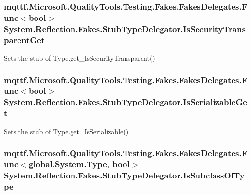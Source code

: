 \hypertarget{class_system_1_1_reflection_1_1_fakes_1_1_stub_type_delegator_a718557fd896385c5f7c66ffaca40c349}{
\subsubsection[{Is\-Security\-Transparent\-Get}]{\setlength{\rightskip}{0pt plus 5cm}mqttf.\-Microsoft.\-Quality\-Tools.\-Testing.\-Fakes.\-Fakes\-Delegates.\-Func$<$bool$>$ System.\-Reflection.\-Fakes.\-Stub\-Type\-Delegator.\-Is\-Security\-Transparent\-Get}}\label{class_system_1_1_reflection_1_1_fakes_1_1_stub_type_delegator_a718557fd896385c5f7c66ffaca40c349}


Sets the stub of Type.\-get\-\_\-\-Is\-Security\-Transparent()

\hypertarget{class_system_1_1_reflection_1_1_fakes_1_1_stub_type_delegator_aa7c37e450e2ba2416e60ce81997560fb}{
\subsubsection[{Is\-Serializable\-Get}]{\setlength{\rightskip}{0pt plus 5cm}mqttf.\-Microsoft.\-Quality\-Tools.\-Testing.\-Fakes.\-Fakes\-Delegates.\-Func$<$bool$>$ System.\-Reflection.\-Fakes.\-Stub\-Type\-Delegator.\-Is\-Serializable\-Get}}\label{class_system_1_1_reflection_1_1_fakes_1_1_stub_type_delegator_aa7c37e450e2ba2416e60ce81997560fb}


Sets the stub of Type.\-get\-\_\-\-Is\-Serializable()

\hypertarget{class_system_1_1_reflection_1_1_fakes_1_1_stub_type_delegator_abc77039b362f40f6ed9e4a541727b085}{
\subsubsection[{Is\-Subclass\-Of\-Type}]{\setlength{\rightskip}{0pt plus 5cm}mqttf.\-Microsoft.\-Quality\-Tools.\-Testing.\-Fakes.\-Fakes\-Delegates.\-Func$<$global.\-System.\-Type, bool$>$ System.\-Reflection.\-Fakes.\-Stub\-Type\-Delegator.\-Is\-Subclass\-Of\-Type}}\label{class_system_1_1_reflection_1_1_fakes_1_1_stub_type_delegator_abc77039b362f40f6ed9e4a541727b085}



